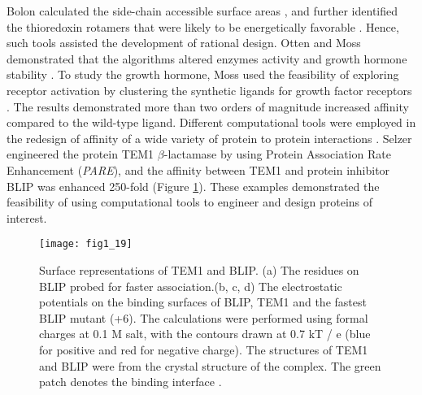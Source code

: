 \begin{refsection}
Bolon  calculated the side-chain accessible surface areas
\cite{Connolly1983}, and further identified the thioredoxin rotamers
that were likely to be energetically favorable \cite{Bolon2003}. Hence, such
tools assisted the development of rational design. Otten  and
Moss  demonstrated that the algorithms altered enzymes activity
\cite{Otten2010a} and growth hormone stability \cite{Moss2009,Lippow2007a}. To
study the growth hormone, Moss  used  the feasibility of
exploring receptor activation by clustering the synthetic ligands for growth
factor receptors \cite{Moss2009}. The results demonstrated more than two orders
of magnitude increased affinity compared to the wild-type ligand. Different
computational tools were employed in the redesign of affinity of a
wide variety of protein to protein interactions \cite{Selzer2000,Reina2002}.
Selzer  engineered the protein TEM1 $\beta$-lactamase by using
Protein Association Rate Enhancement (\emph{PARE}), and the affinity between
TEM1 and protein inhibitor BLIP was enhanced 250-fold \cite{Selzer2000}
(Figure \ref{fig:tem1}). These examples demonstrated the feasibility of using
computational tools to engineer and design proteins of interest. 
\begin{figure}[htbp] \centering \texttt{[image: fig1\_19]}
    \caption[Surface representations of TEM1 and BLIP. (a) The residues on BLIP
        probed for faster association.(b, c, d) The electrostatic potentials on
        the binding surfaces of BLIP, TEM1 and the fastest BLIP mutant (+6).
        The calculations were performed using formal charges at 0.1 M salt,
        with the contours drawn at 0.7 kT / e (blue for positive and red for
        negative charge). The structures of TEM1 and BLIP were from the crystal
        structure of the complex. The green patch denotes the binding
    interface.]{Surface representations of TEM1 and BLIP. (a) The residues on
        BLIP probed for faster association.(b, c, d) The electrostatic potentials
        on the binding surfaces of BLIP, TEM1 and the fastest BLIP mutant (+6).
        The calculations were performed using formal charges at 0.1 M salt,
        with the contours drawn at 0.7 kT / e (blue for positive and red for
        negative charge). The structures of TEM1 and BLIP were from the crystal
        structure of the complex. The green patch denotes the binding
        interface \cite{Selzer2000}.} \label{fig:tem1} 
\end{figure}


\end{refsection}
